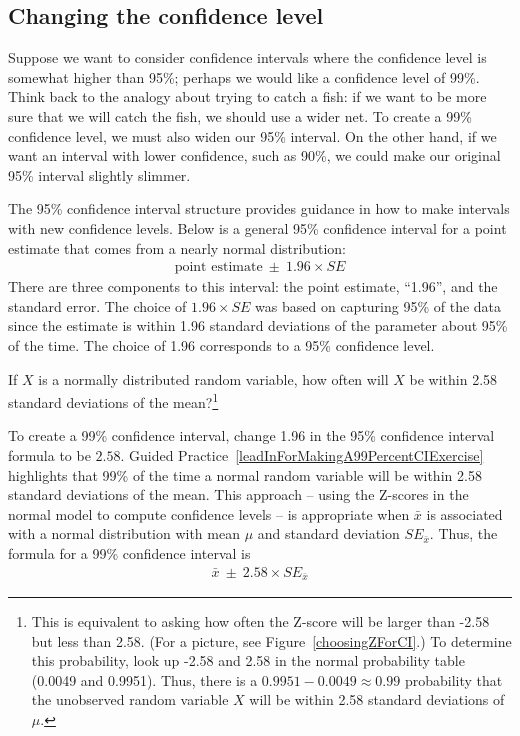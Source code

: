 \subsection{Changing the confidence level}
\label{changingTheConfidenceLevelSection}


Suppose we want to consider confidence intervals where the confidence level is somewhat higher than 95\%; perhaps we would like a confidence level of 99\%. Think back to the analogy about trying to catch a fish: if we want to be more sure that we will catch the fish, we should use a wider net. To create a 99\% confidence level, we must also widen our 95\% interval. On the other hand, if we want an interval with lower confidence, such as 90\%, we could make our original 95\% interval slightly slimmer.

The 95\% confidence interval structure provides guidance in how to make intervals with new confidence levels. Below is a general 95\% confidence interval for a point estimate that comes from a nearly normal distribution:
\begin{eqnarray}
\text{point estimate}\ \pm\ 1.96\times SE
\end{eqnarray}
There are three components to this interval: the point estimate, ``1.96'', and the standard error. The choice of $1.96\times SE$ was based on capturing 95\% of the data since the estimate is within 1.96 standard deviations of the parameter about 95\% of the time. The choice of 1.96 corresponds to a 95\% confidence level. 

\begin{exercise} \label{leadInForMakingA99PercentCIExercise}
If $X$ is a normally distributed random variable, how often will $X$ be within 2.58 standard deviations of the mean?\footnote{This is equivalent to asking how often the Z-score will be larger than -2.58 but less than 2.58. (For a picture, see Figure~\ref{choosingZForCI}.) To determine this probability, look up -2.58 and 2.58 in the normal probability table (0.0049 and 0.9951). Thus, there is a $0.9951-0.0049 \approx 0.99$ probability that the unobserved random variable $X$ will be within 2.58 standard deviations of $\mu$.}
\end{exercise}

To create a 99\% confidence interval, change 1.96 in the 95\% confidence interval formula to be $2.58$. Guided Practice~\ref{leadInForMakingA99PercentCIExercise} highlights that 99\% of the time a normal random variable will be within 2.58 standard deviations of the mean. This approach -- using the Z-scores in the normal model to compute confidence levels -- is appropriate when $\bar{x}$ is associated with a normal distribution with mean $\mu$ and standard deviation $SE_{\bar{x}}$. Thus, the formula for a 99\% confidence interval is
\begin{eqnarray}
\bar{x}\ \pm\ 2.58\times SE_{\bar{x}}
\label{99PercCIForMean}
\end{eqnarray}

